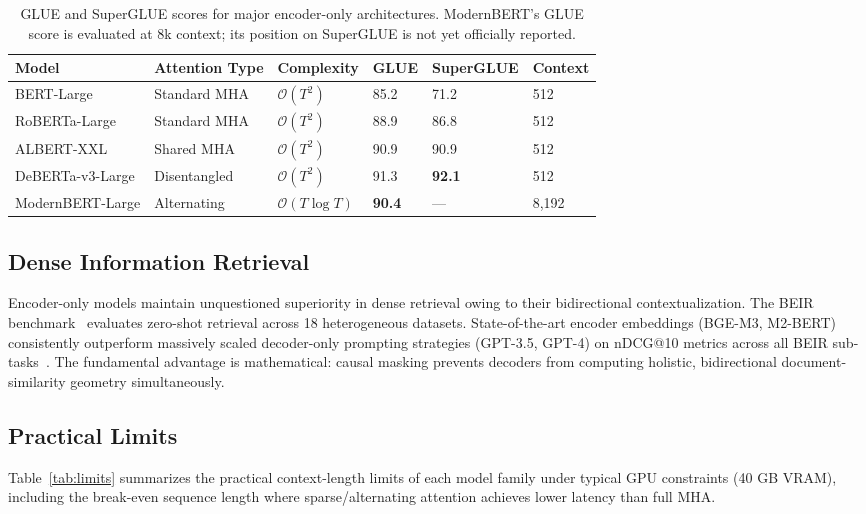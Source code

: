 \documentclass[11pt]{article}
\begin{document}
\begin{table}[h]
\centering
\renewcommand{\arraystretch}{1.3}
\begin{tabular}{@{}llllll@{}}
\toprule
\textbf{Model} & \textbf{Attention Type} & \textbf{Complexity} & \textbf{GLUE} & \textbf{SuperGLUE} & \textbf{Context} \\
\midrule
BERT-Large & Standard MHA & $\mathcal{O}(T^2)$ & 85.2 & 71.2 & 512 \\
RoBERTa-Large & Standard MHA & $\mathcal{O}(T^2)$ & 88.9 & 86.8 & 512 \\
ALBERT-XXL & Shared MHA & $\mathcal{O}(T^2)$ & 90.9 & 90.9 & 512 \\
DeBERTa-v3-Large & Disentangled & $\mathcal{O}(T^2)$ & 91.3 & \textbf{92.1} & 512 \\
ModernBERT-Large & Alternating & $\mathcal{O}(T \log T)$ & \textbf{90.4} & — & 8,192 \\
\bottomrule
\end{tabular}
\caption{GLUE and SuperGLUE scores for major encoder-only architectures. ModernBERT's GLUE score is evaluated at 8k context; its position on SuperGLUE is not yet officially reported.}
\label{tab:benchmarks}
\end{table}

\subsection{Dense Information Retrieval}

Encoder-only models maintain unquestioned superiority in dense retrieval owing to their bidirectional contextualization. The BEIR benchmark~\cite{thakur2021beir} evaluates zero-shot retrieval across 18 heterogeneous datasets. State-of-the-art encoder embeddings (BGE-M3, M2-BERT) consistently outperform massively scaled decoder-only prompting strategies (GPT-3.5, GPT-4) on nDCG@10 metrics across all BEIR sub-tasks~\cite{chen2024bge}. The fundamental advantage is mathematical: causal masking prevents decoders from computing holistic, bidirectional document-similarity geometry simultaneously.

\subsection{Practical Limits}

Table~\ref{tab:limits} summarizes the practical context-length limits of each model family under typical GPU constraints (40 GB VRAM), including the break-even sequence length where sparse/alternating attention achieves lower latency than full MHA.
\end{document}
